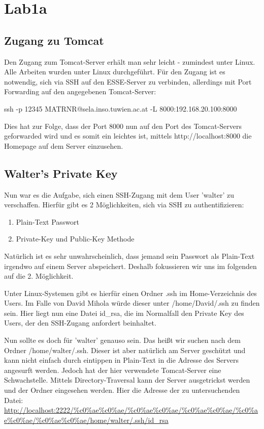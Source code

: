 \section{Lab1a}

\subsection{Zugang zu Tomcat}
Den Zugang zum Tomcat-Server erhält man sehr leicht - zumindest unter Linux. Alle Arbeiten wurden unter Linux
durchgeführt. Für den Zugang ist es notwendig, sich via SSH auf den ESSE-Server zu verbinden, allerdings mit Port Forwarding
auf den angegebenen Tomcat-Server:

ssh -p 12345 MATRNR@sela.inso.tuwien.ac.at -L 8000:192.168.20.100:8000

Dies hat zur Folge, dass der Port 8000 nun auf den Port des Tomcat-Servers geforwarded wird und es somit ein leichtes
ist, mittels http://localhost:8000 die Homepage auf dem Server einzusehen.

\subsection{Walter's Private Key}
Nun war es die Aufgabe, sich einen SSH-Zugang mit dem User 'walter' zu verschaffen. Hierfür gibt es 2 Möglichkeiten, sich
via SSH zu authentifizieren:
\begin{enumerate}
\item Plain-Text Passwort
\item Private-Key und Public-Key Methode
\end{enumerate}

Natürlich ist es sehr unwahrscheinlich, dass jemand sein Passwort als Plain-Text irgendwo auf einem Server abspeichert. Deshalb
fokussieren wir uns im folgenden auf die 2. Möglichkeit.

Unter Linux-Systemen gibt es hierfür einen Ordner .ssh im Home-Verzeichnis des Users. Im Falle von David Mihola würde
dieser unter /home/David/.ssh zu finden sein. Hier liegt nun eine Datei id\_rsa, die im Normalfall den Private Key
des Users, der den SSH-Zugang anfordert beinhaltet.

Nun sollte es doch für 'walter' genauso sein. Das heißt wir suchen nach dem Ordner /home/walter/.ssh. Dieser ist aber
natürlich am Server geschützt und kann nicht einfach durch eintippen in Plain-Text in die Adresse des Servers
angesurft werden. Jedoch hat der hier verwendete Tomcat-Server eine Schwachstelle. Mittels Directory-Traversal kann
der Server ausgetrickst werden und der Ordner eingesehen werden. Hier die Adresse der zu untersuchenden Datei:
\url{http://localhost:2222/%c0%ae%c0%ae/%c0%ae%c0%ae/%c0%ae%c0%ae/%c0%ae%c0%ae/%c0%ae%c0%ae/home/walter/.ssh/id\_rsa}

